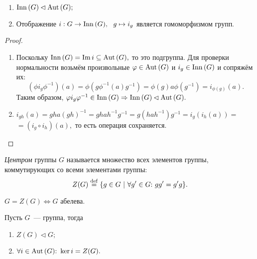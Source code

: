           \begin{lemma}
          \
            \begin{enumerate}
            \setlength\itemsep{0.1em}
                \item ${\mathrm{Inn} \,(G) \lhd \mathrm{Aut} \,(G);}$
                \item Отображение ${i : G \rightarrow \mathrm{Inn} \,(G), \ \ g \mapsto i_g}$ является гомоморфизмом групп.
            \end{enumerate}
          \end{lemma}
          \begin{proof}
          \
            \begin{enumerate}
                \setlength\itemsep{0.1em}
                \item Поскольку ${\mathrm{Inn} \,(G) = \mathrm{Im} \, i \subseteq \mathrm{Aut} \,(G),}$ то это подгруппа. \newline
              Для проверки нормальности возьмём произвольные ${\varphi \in \mathrm{Aut} \,(G)}$ и ${i_g \in \mathrm{Inn} \,(G)}$ и сопряжём их:
              \begin{equation*}
                  (\phi i_g \phi^{-1})(a) = \phi(g \phi^{-1}(a) g^{-1}) =  \phi(g) a \phi(g^{-1}) = i_{\phi(g)}(a).
              \end{equation*}
              Таким образом, ${\varphi i_g \varphi^{-1} \in \mathrm{Inn} \,(G) \Rightarrow \mathrm{Inn} \,(G) \lhd \mathrm{Aut} \,(G).}$
                \item ${i_{gh}(a) = gha(gh)^{-1} = ghah^{-1}g^{-1} = g(hah^{-1})g^{-1} = i_g(i_h(a)) =}$ ${= (i_g \circ i_h)(a),}$ то есть операция сохраняется. \qedhere
            \end{enumerate}
            \end{proof}
            \begin{definition}
              \textit{Центром} группы $G$ называется множество всех элементов группы, коммутирующих со всеми элементами группы:
              \begin{equation*}
                  Z(G) \stackrel{\mathrm{def}}{=} \{g \in G \ | \ \forall g' \in G{:}{ } \  gg' = g'g\}.
              \end{equation*}
          \end{definition}
          \begin{remark}
              ${G = Z(G) \Leftrightarrow G}$ абелева.
          \end{remark}
          \newpage
          \begin{lemma}
              Пусть $G$~--- группа, тогда
              \begin{enumerate}
              \setlength\itemsep{0.1em}
                  \item ${Z(G) \lhd G;}$
                  \item ${\forall i \in \mathrm{Aut} \,(G){:}{ } \  \ker i = Z(G).}$
              \end{enumerate}
          \end{lemma}
